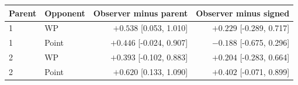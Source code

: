\begin{tabular}{llrr}
\toprule
Parent & Opponent & Observer minus parent & Observer minus signed \\
\midrule
1 & WP & $+0.538$ [0.053, 1.010] & $+0.229$ [-0.289, 0.717] \\
1 & Point & $+0.446$ [-0.024, 0.907] & $-0.188$ [-0.675, 0.296] \\
2 & WP & $+0.393$ [-0.102, 0.883] & $+0.204$ [-0.283, 0.664] \\
2 & Point & $+0.620$ [0.133, 1.090] & $+0.402$ [-0.071, 0.899] \\
\bottomrule
\end{tabular}
